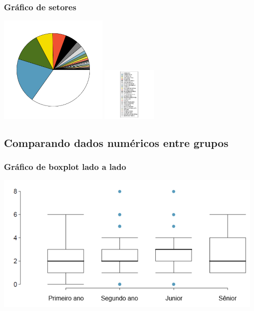 \begin{frame}
\frametitle{Gráfico de setores}
\justifying
{}

\vspace{-0.5cm}

\begin{center}
\includegraphics[width=0.4\textwidth]{1-7_categorical_data/mammal_pie_chart.pdf}
\includegraphics[width=0.2\textwidth]{1-7_categorical_data/mammal_pie_chart_legend.pdf}
\end{center}
\justifying
{}

\end{frame}



\subsection{Comparando dados numéricos entre grupos}


\begin{frame}
\frametitle{Gráfico de boxplot lado a lado}
\justifying
{}

\begin{center}
\includegraphics[width=\textwidth]{1-7_categorical_data/year_clubs.png}
\end{center}
\end{frame}



